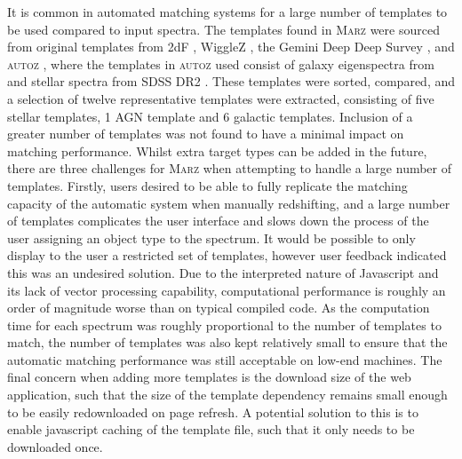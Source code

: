\documentclass[iop]{emulateapj}
\newcommand{\autoz}{\textsc{autoz}}
\newcommand{\marz}{\textsc{Marz}}
\begin{document}
It is common in automated matching systems for a large number of templates to be used compared to input spectra. The templates found in \marz{} were sourced from original templates from 2dF \citep{colless2001}, WiggleZ \citep{Drinkwater21012010}, the Gemini Deep Deep Survey \citet{abraham2004}, and \autoz{} \citep{baldry2014galaxy}, where the templates in \autoz{} used consist of galaxy eigenspectra from \citet{bolton2012} and stellar spectra from SDSS DR2 \citep{SubbaRao2002}. These templates were sorted, compared, and a selection of twelve representative templates were extracted, consisting of five stellar templates, 1 AGN template and 6 galactic templates. Inclusion of a greater number of templates was not found to have a minimal impact on matching performance. Whilst extra target types can be added in the future, there are three challenges for \marz{} when attempting to handle a large number of templates. Firstly, users desired to be able to fully replicate the matching capacity of the automatic system when manually redshifting, and a large number of templates complicates the user interface and slows down the process of the user assigning an object type to the spectrum. It would be possible to only display to the user a restricted set of templates, however user feedback indicated this was an undesired solution. Due to the interpreted nature of Javascript and its lack of vector processing capability, computational performance is roughly an order of magnitude worse than on typical compiled code. As the computation time for each spectrum was roughly proportional to the number of templates to match, the number of templates was also kept relatively small to ensure that the automatic matching performance was still acceptable on low-end machines. The final concern when adding more templates is the download size of the web application, such that the size of the template dependency remains small enough to be easily redownloaded on page refresh. A potential solution to this is to enable javascript caching of the template file, such that it only needs to be downloaded once.


\clearpage
\end{document}

